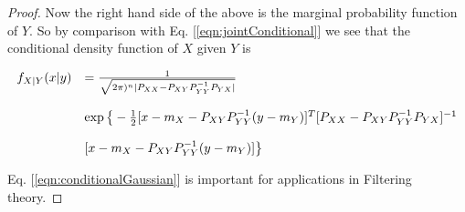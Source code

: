 \begin{proof}
Now the right hand side of the above is the marginal probability function of $Y$. So by comparison with Eq. [\ref{eqn:jointConditional}] we see that the conditional density function of $X$ given $Y$ is

\begin{equation}
\label{eqn:conditionalGaussian}
\begin{array}{cl}
f_{X|Y}(x|y) &= {1\over\sqrt{2\pi)^n |P_{XX} - P_{XY}P_{YY}^{-1}P_{YX} | }} \\ \\
\null & \exp \big\{ -{1\over2}[x - m_X  - P_{XY}P_{YY}^{-1}(y - m_Y)]^T [P_{XX} - P_{XY}P_{YY}^{-1}P_{YX} ]^{-1} \\ \\
\null & [x - m_X -  P_{XY} P_{YY}^{-1} (y - m_Y) ] \big\} 
\end{array}
\end{equation}

Eq. [\ref{eqn:conditionalGaussian}] is important for applications in Filtering theory. 

\end{proof}


